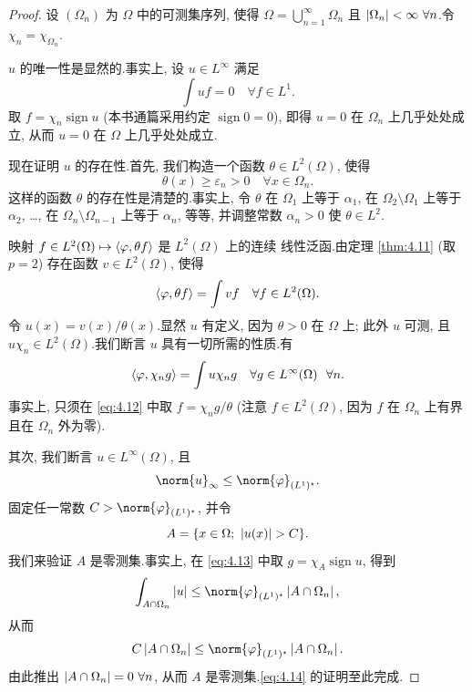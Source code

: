 \begin{proof}
设 $(\Omega_n)$ 为 $\Omega$ 中的可测集序列, 使得
$\Omega=\bigcup_{n=1}^\infty\Omega_n$ 且 $\left|\Omega_n\right|<\infty\ \forall n$.令
$\chi_n=\chi_{\Omega_n}$.

$u$ 的唯一性是显然的.事实上, 设 $u\in L^\infty$ 满足
\begin{equation*}
\int uf=0\quad\forall f\in L^1.
\end{equation*}
取 $f=\chi_n\operatorname{sign}u$ (本书通篇采用约定 $\operatorname{sign}0=0$),
即得 $u=0$ 在 $\Omega_n$ 上几乎处处成立, 从而 $u=0$ 在 $\Omega$ 上几乎处处成立.

现在证明 $u$ 的存在性.首先, 我们构造一个函数 $\theta\in L^2(\Omega)$, 使得
\begin{equation*}
\theta(x)\ge\varepsilon_n>0\quad\forall x\in\Omega_n.
\end{equation*}
这样的函数 $\theta$ 的存在性是清楚的.事实上, 令 $\theta$ 在 $\Omega_1$ 上等于
$\alpha_1$, 在 $\Omega_2\setminus\Omega_1$ 上等于 $\alpha_2$, …, 在
$\Omega_n\setminus\Omega_{n-1}$ 上等于 $\alpha_n$, 等等, 并调整常数
$\alpha_n>0$ 使 $\theta\in L^2$.

映射 $f\in L^2(\Omega)\mapsto\left\langle \varphi,\theta f\right\rangle$ 是 $L^2(\Omega)$ 上的连续
线性泛函.由定理  \ref{thm:4.11} (取 $p=2$) 存在函数 $v\in L^2(\Omega)$, 使得
\begin{equation}
\left\langle \varphi,\theta f\right\rangle=\int vf\quad\forall f\in L^2(\Omega).
\label{eq:4.12}
\end{equation}
令 $u(x)=v(x)/\theta(x)$.显然 $u$ 有定义, 因为 $\theta>0$ 在 $\Omega$ 上; 此外
$u$ 可测, 且 $u\chi_n\in L^2(\Omega)$.我们断言 $u$ 具有一切所需的性质.有
\begin{equation}
\left\langle \varphi,\chi_ng\right\rangle=\int u\chi_ng\quad\forall g\in L^\infty(\Omega)\ \ \forall n.
\label{eq:4.13}
\end{equation}
事实上, 只须在 \eqref{eq:4.12} 中取 $f=\chi_ng/\theta$ (注意 $f\in L^2(\Omega)$,
因为 $f$ 在 $\Omega_n$ 上有界且在 $\Omega_n$ 外为零).

其次, 我们断言 $u\in L^\infty(\Omega)$, 且
\begin{equation}
\norm{u}_\infty\le\norm{\varphi}_{(L^1)^\star}.
\label{eq:4.14}
\end{equation}
固定任一常数 $C>\norm{\varphi}_{(L^1)^\star}$, 并令
\begin{equation*}
A=\{x\in\Omega;\ \abs{u(x)}>C\}.
\end{equation*}
我们来验证 $A$ 是零测集.事实上, 在 \eqref{eq:4.13} 中取
$g=\chi_A\operatorname{sign}u$, 得到
\begin{equation*}
\int_{A\cap\Omega_n}\abs{u}\le\norm{\varphi}_{(L^1)^\star}\abs{A\cap\Omega_n},
\end{equation*}
从而
\begin{equation*}
C\abs{A\cap\Omega_n}\le\norm{\varphi}_{(L^1)^\star}\abs{A\cap\Omega_n}.
\end{equation*}
由此推出 $\left|A\cap\Omega_n\right|=0\ \forall n$, 从而 $A$ 是零测集.\eqref{eq:4.14}
的证明至此完成.


\end{proof}
